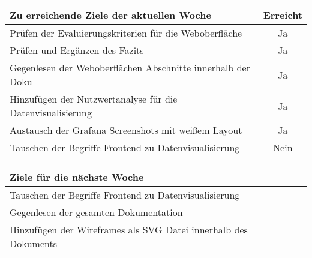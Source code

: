 \begin{tabularx}{\textwidth}{Xc}
    \arrayrulecolor{OliveGreen}
    \toprule
    {\bfseries Zu erreichende Ziele der aktuellen Woche} & {\bfseries Erreicht} \\
    \midrule[2pt]
    Prüfen der Evaluierungskriterien für die Weboberfläche  &Ja              \\
    \rowcolor{OliveGreen!15}
    Prüfen und Ergänzen des Fazits                          &Ja              \\
    \rowcolor{White}
    Gegenlesen der Weboberflächen Abschnitte innerhalb der Doku  &Ja         \\
    \rowcolor{OliveGreen!15}
    Hinzufügen der Nutzwertanalyse für die Datenvisualisierung  &Ja          \\
    \rowcolor{White}
    Austausch der Grafana Screenshots mit weißem Layout         &Ja          \\
    \rowcolor{White}
    Tauschen der Begriffe Frontend zu Datenvisualisierung      &Nein         \\
    \bottomrule[2pt]
\end{tabularx}
%
\vspace{1cm}
%
\begin{tabularx}{\textwidth}{Xc}
    \arrayrulecolor{OliveGreen}
    \toprule
    {\bfseries Ziele für die nächste Woche}        &                         \\
    \midrule[2pt]
    Tauschen der Begriffe Frontend zu Datenvisualisierung  &                 \\
    \rowcolor{OliveGreen!15}
    Gegenlesen der gesamten Dokumentation   &                                \\
    \rowcolor{White}
    Hinzufügen der Wireframes als SVG Datei innerhalb des Dokuments &        \\
\end{tabularx}

